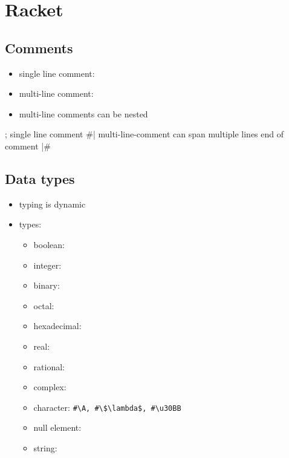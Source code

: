 \documentclass[a4paper,landscape,10pt]{article}
\begin{document}
\section{Racket}
\begin{multicols*}{2}
  \subsection{Comments}

  \begin{itemize}
    \item single line comment: \iracket{;}
    \item multi-line comment: 
    \item multi-line comments can be nested
  \end{itemize}

  \begin{racket}
    ; single line comment
    #|
    multi-line-comment
    can span
    multiple lines
    end of comment
    |#
  \end{racket}

  \subsection{Data types}

  \begin{itemize}
    \item typing is dynamic
    \item types:
          \begin{itemize}
            \item boolean: \iracket{#\\t, #\\f}
            \item integer: 
            \item binary: 
            \item octal: 
            \item hexadecimal: 
            \item real: 
            \item rational: 
            \item complex: 
            \item character: \lstinline[language=CustomRacket, mathescape=true]!#\A, #\$\lambda$, #\u30BB!
            \item null element: 
            \item string: 
          \end{itemize}
  \end{itemize}


\end{multicols*}
\end{document}
